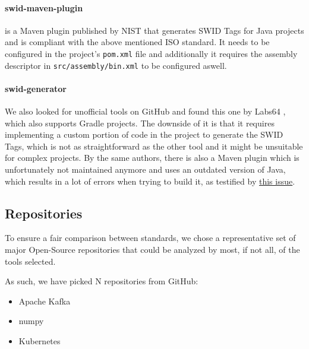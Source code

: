 \paragraph{swid-maven-plugin} is a Maven plugin published by NIST \cite{repository:swid-maven-plugin} that generates SWID Tags for Java projects and is compliant with the above mentioned ISO standard. It needs to be configured in the project's \verb|pom.xml| file and additionally it requires the assembly descriptor in \verb|src/assembly/bin.xml| to be configured aswell.
\paragraph{swid-generator} We also looked for unofficial tools on GitHub and found this one by Labs64 \cite{repo:swid-generator}, which also supports Gradle projects. The downside of it is that it requires implementing a custom portion of code in the project to generate the SWID Tags, which is not as straightforward as the other tool and it might be unsuitable for complex projects. By the same authors, there is also a Maven plugin which is unfortunately not maintained anymore and uses an outdated version of Java, which results in a lot of errors when trying to build it, as testified by \href{https://github.com/Labs64/swid-maven-plugin/issues/5}{this issue}.

\subsection{Repositories} \label{methodology:repositories}

To ensure a fair comparison between standards, we chose a representative set of major Open-Source repositories that could be analyzed by most, if not all, of the tools selected.

As such, we have picked N repositories from GitHub:

\begin{itemize}
    \item Apache Kafka \cite{repository:dataset:kafka}
    \item numpy \cite{repository:dataset:numpy}
    \item Kubernetes \cite{repository:dataset:k8s}
\end{itemize}